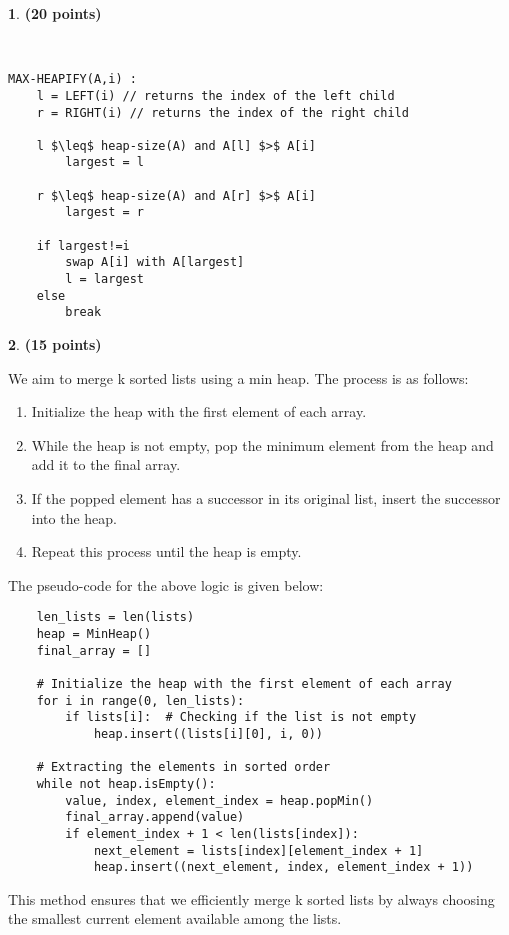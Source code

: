 \documentclass[11pt]{article}
\theoremstyle{definition}
\newtheorem{prob}{}
\newcommand{\solution}{\medskip\noindent{\color{DarkBlue}\textbf{Solution:}}}
\begin{document}

\begin{prob} \textbf{(20 points)}
\end{prob}
\solution \\

\begin{verbatim}
MAX-HEAPIFY(A,i) : 
    l = LEFT(i) // returns the index of the left child
    r = RIGHT(i) // returns the index of the right child

    l $\leq$ heap-size(A) and A[l] $>$ A[i]
        largest = l

    r $\leq$ heap-size(A) and A[r] $>$ A[i]
        largest = r

    if largest!=i
        swap A[i] with A[largest]
        l = largest
    else
        break
\end{verbatim}

\begin{prob} \textbf{(15 points)}

    \end{prob}
    
    \solution
    
    We aim to merge k sorted lists using a min heap. The process is as follows:
    
    \begin{enumerate}
        \item Initialize the heap with the first element of each array.
        \item While the heap is not empty, pop the minimum element from the heap and add it to the final array.
        \item If the popped element has a successor in its original list, insert the successor into the heap.
        \item Repeat this process until the heap is empty.
    \end{enumerate}
    
    The pseudo-code for the above logic is given below:
    
    \begin{verbatim}
    len_lists = len(lists)
    heap = MinHeap()
    final_array = []
    
    # Initialize the heap with the first element of each array
    for i in range(0, len_lists):
        if lists[i]:  # Checking if the list is not empty
            heap.insert((lists[i][0], i, 0))
    
    # Extracting the elements in sorted order
    while not heap.isEmpty():
        value, index, element_index = heap.popMin()
        final_array.append(value)
        if element_index + 1 < len(lists[index]):
            next_element = lists[index][element_index + 1]
            heap.insert((next_element, index, element_index + 1))
    \end{verbatim}
    
    This method ensures that we efficiently merge k sorted lists by always choosing the smallest current element available among the lists.
\end{document}
